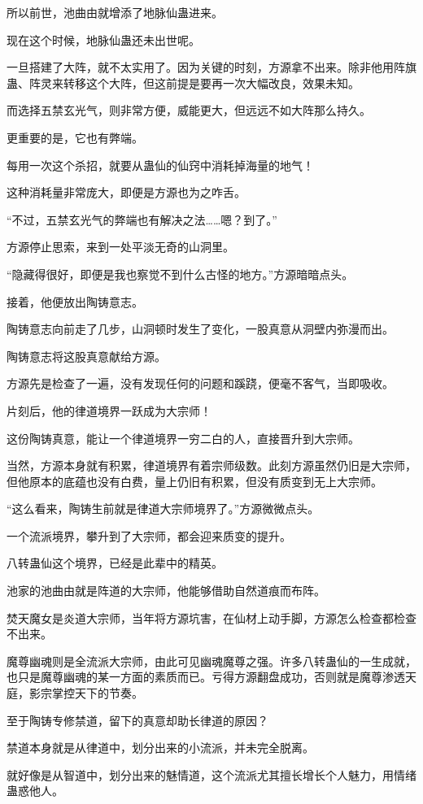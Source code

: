 \begin{this_body}
所以前世，池曲由就增添了地脉仙蛊进来。

现在这个时候，地脉仙蛊还未出世呢。

一旦搭建了大阵，就不太实用了。因为关键的时刻，方源拿不出来。除非他用阵旗蛊、阵灵来转移这个大阵，但这前提是要再一次大幅改良，效果未知。

而选择五禁玄光气，则非常方便，威能更大，但远远不如大阵那么持久。

更重要的是，它也有弊端。

每用一次这个杀招，就要从蛊仙的仙窍中消耗掉海量的地气！

这种消耗量非常庞大，即便是方源也为之咋舌。

“不过，五禁玄光气的弊端也有解决之法……嗯？到了。”

方源停止思索，来到一处平淡无奇的山洞里。

“隐藏得很好，即便是我也察觉不到什么古怪的地方。”方源暗暗点头。

接着，他便放出陶铸意志。

陶铸意志向前走了几步，山洞顿时发生了变化，一股真意从洞壁内弥漫而出。

陶铸意志将这股真意献给方源。

方源先是检查了一遍，没有发现任何的问题和蹊跷，便毫不客气，当即吸收。

片刻后，他的律道境界一跃成为大宗师！

这份陶铸真意，能让一个律道境界一穷二白的人，直接晋升到大宗师。

当然，方源本身就有积累，律道境界有着宗师级数。此刻方源虽然仍旧是大宗师，但他原本的底蕴也没有白费，量上仍旧有积累，但没有质变到无上大宗师。

“这么看来，陶铸生前就是律道大宗师境界了。”方源微微点头。

一个流派境界，攀升到了大宗师，都会迎来质变的提升。

八转蛊仙这个境界，已经是此辈中的精英。

池家的池曲由就是阵道的大宗师，他能够借助自然道痕而布阵。

焚天魔女是炎道大宗师，当年将方源坑害，在仙材上动手脚，方源怎么检查都检查不出来。

魔尊幽魂则是全流派大宗师，由此可见幽魂魔尊之强。许多八转蛊仙的一生成就，也只是魔尊幽魂的某一方面的素质而已。亏得方源翻盘成功，否则就是魔尊渗透天庭，影宗掌控天下的节奏。

至于陶铸专修禁道，留下的真意却助长律道的原因？

禁道本身就是从律道中，划分出来的小流派，并未完全脱离。

就好像是从智道中，划分出来的魅情道，这个流派尤其擅长增长个人魅力，用情绪蛊惑他人。


\end{this_body}
